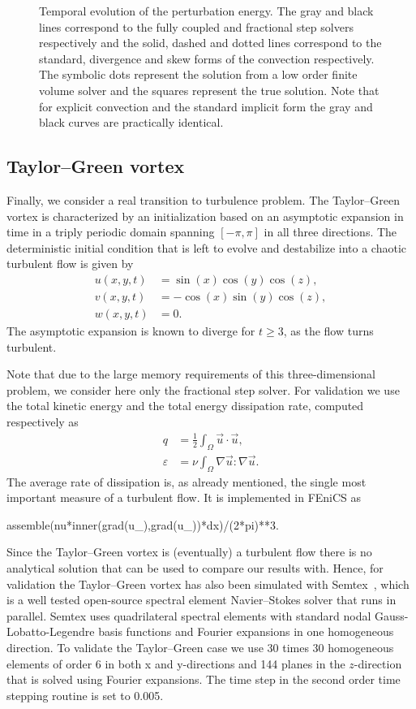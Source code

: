 \begin{figure}
 \caption{Temporal evolution of the perturbation energy. The gray and
   black lines correspond to the fully coupled and fractional step
   solvers respectively and the solid, dashed and dotted lines
   correspond to the standard, divergence and skew forms of the
   convection respectively. The symbolic dots represent the solution
   from a low order finite volume solver and the squares represent the
   true solution. Note that for explicit convection and the standard
   implicit form the gray and black curves are practically
   identical. }
\label{fig:mortensen:OS_long_time}
\end{figure}

\subsection{Taylor--Green vortex}
\label{sec:mortensen:TG}
Finally, we consider a real transition to turbulence problem. The
Taylor--Green vortex is characterized by an initialization based on an
asymptotic expansion in time in a triply periodic domain spanning
$[-\pi,\pi]$ in all three directions. The deterministic initial
condition that is left to evolve and destabilize into a chaotic
turbulent flow is given by
\begin{align}
 u(x,y,t)&=\sin(x)\cos(y)\cos(z),\\
 v(x,y,t)&=-\cos(x)\sin(y)\cos(z),\\
 w(x,y,t)&=0.
\end{align}
The asymptotic expansion is known to diverge for $t \ge 3$, as the
flow turns turbulent.

Note that due to the large memory requirements of this
three-dimensional problem, we consider here only the fractional step
solver. For validation we use the total kinetic energy and the total
energy dissipation rate, computed respectively as
\begin{align}
 q &= \frac{1}{2} \int_{\Omega} \vec{u} \cdot \vec{u}, \label{eq:mortensen:q} \\
 \varepsilon &= \nu \int_{\Omega} \nabla \vec{u}: \nabla \vec{u}. \label{eq:mortensen:diss}
\end{align}
The average rate of dissipation is, as already mentioned, the single most important measure of a turbulent flow. It is implemented in FEniCS as
\begin{python}
assemble(nu*inner(grad(u_),grad(u_))*dx)/(2*pi)**3.
\end{python}

Since the Taylor--Green vortex is (eventually) a turbulent flow there
is no analytical solution that can be used to compare our results
with. Hence, for validation the Taylor--Green vortex has also been
simulated with Semtex~\citep{Blackburn2009}, which is a well tested
open-source spectral element Navier--Stokes solver that runs in
parallel. Semtex uses quadrilateral spectral elements with standard
nodal Gauss-Lobatto-Legendre basis functions and Fourier expansions in
one homogeneous direction. To validate the Taylor--Green case we use 30
times 30 homogeneous elements of order 6 in both x and y-directions
and 144 planes in the $z$-direction that is solved using Fourier
expansions. The time step in the second order time stepping routine is
set to 0.005.

